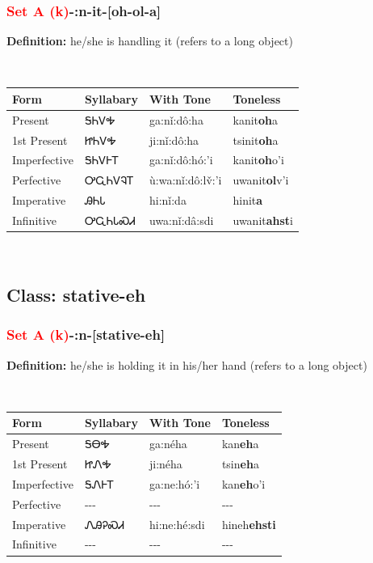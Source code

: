 \subsubsection*{\textcolor{Red}{Set A (k)}{-}\textbf{:n}{-}it{-}[oh-ol-a]}
\nopagebreak
\textbf{Definition: } he/she is handling it (refers to a long object)
\\[0.5em]
\begin{tabularx}{\textwidth}{l X X X}%
\toprule%
\textbf{Form}&\textbf{Syllabary}&\textbf{With Tone}&\textbf{Toneless}\\%
\midrule%
Present&ᎦᏂᏙᎭ&ga:nǐ:dô:ha&kanit\textbf{oh}a\\%
1st Present&ᏥᏂᏙᎭ&ji:nǐ:dô:ha&tsinit\textbf{oh}a\\%
Imperfective&ᎦᏂᏙᎰᎢ&ga:nǐ:dô:hó:’i&kanit\textbf{oh}o'i\\%
Perfective&ᎤᏩᏂᏙᎸᎢ&ù:wa:nǐ:dô:lv̌:’i&uwanit\textbf{ol}v'i\\%
Imperative&ᎯᏂᏓ&hi:nǐ:da&hinit\textbf{a}\\%
Infinitive&ᎤᏩᏂᏓᏍᏗ&uwa:nǐ:dâ:sdi&uwanit\textbf{ahst}i\\%
\bottomrule%
\end{tabularx}
\\[1em]
\needspace{3in}
\subsection*{Class: stative-eh}
\nopagebreak
\needspace{2in}
\subsubsection*{\textcolor{Red}{Set A (k)}{-}\textbf{:n}{-}[stative-eh]}
\nopagebreak
\textbf{Definition: } he/she is holding it in his/her hand (refers to a long object)
\\[0.5em]
\begin{tabularx}{\textwidth}{l X X X}%
\toprule%
\textbf{Form}&\textbf{Syllabary}&\textbf{With Tone}&\textbf{Toneless}\\%
\midrule%
Present&ᎦᎾᎭ&ga:néha&kan\textbf{eh}a\\%
1st Present&ᏥᏁᎭ&ji:néha&tsin\textbf{eh}a\\%
Imperfective&ᎦᏁᎰᎢ&ga:ne:hó:’i&kan\textbf{eh}o'i\\%
Perfective&{-}{-}{-}&{-}{-}{-}&{-}{-}{-}\\%
Imperative&ᏁᎯᎮᏍᏗ&hi:ne:hé:sdi&hineh\textbf{ehsti}\\%
Infinitive&{-}{-}{-}&{-}{-}{-}&{-}{-}{-}\\%
\bottomrule%
\end{tabularx}
\\[1em]